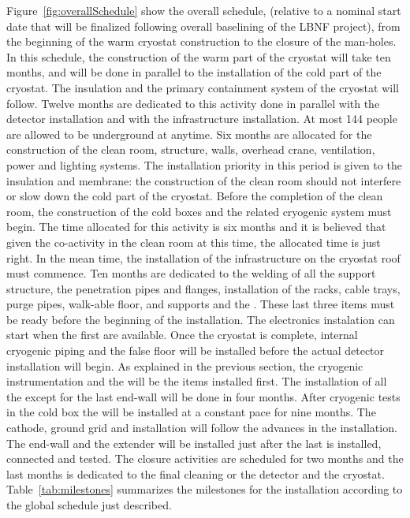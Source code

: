 Figure~\ref{fig:overallSchedule} show the overall schedule, (relative to a nominal start date that will be finalized following overall baselining of the LBNF project), from the beginning of the warm cryostat construction to the closure of the man-holes.
In this schedule, the construction of the warm part of the  cryostat will take ten months, and will be done in parallel to the installation of the cold part of the  cryostat.
The insulation and the primary containment system of the  cryostat will follow.
Twelve months are dedicated to this activity done in parallel with the  detector installation and with the  infrastructure installation.
At most 144 people are allowed to be underground at anytime.
Six months are allocated for the construction of the clean room, structure, walls, overhead crane, ventilation, power and lighting systems. 
The installation priority in this period is given to the insulation and membrane: the construction of the clean room should not interfere or slow down the cold part of the cryostat.
Before the completion of the clean room, the construction of the cold boxes and the related cryogenic system must begin.
The time allocated for this activity is six months and it is believed that given the co-activity in the clean room at this time, the allocated time is just right.
In the mean time, the installation of the infrastructure on the cryostat roof must commence.
Ten months are dedicated to the welding of all the support structure, the penetration pipes and flanges, installation of the racks, cable trays, purge pipes, walk-able floor,  and  supports and the .
These last three items must be ready before the beginning of the  installation.
The electronics instalation can start when the first  are available.
Once the cryostat is complete, internal cryogenic piping and the false floor will be installed before the actual detector installation will begin.
As explained in the previous section, the cryogenic instrumentation and the  will be the items installed first.
The installation of all the  except for the last end-wall will be done in four months.
After cryogenic tests in the cold box the  will be installed at a constant pace for nine months.
The cathode, ground grid and  installation will follow the advances in the  installation.
The  end-wall and the  extender will be installed just after the last  is installed, connected and tested.
The  closure activities are scheduled for two months and the last months is dedicated to the final cleaning or the detector and the cryostat.
Table~\ref{tab:milestones} summarizes the milestones for the  installation according to the global schedule just described.



